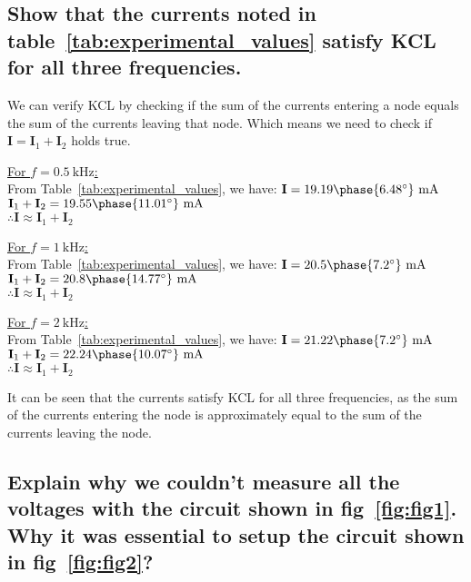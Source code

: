 \documentclass[12pt]{article}
\begin{document}
\begin{large}
	\subsection{Show that the currents noted in table~\ref{tab:experimental_values} satisfy KCL for all three frequencies.}
	We can verify KCL by checking if the sum of the currents entering a node equals the sum of the currents leaving that node. Which means we need to check if $ \mathbf{I} = \mathbf{I}_1 + \mathbf{I}_2 $ holds true.
	\par \underline{For $ f = \SI{0.5}{\kilo\hertz} $:}\\
	From Table~\ref{tab:experimental_values}, we have:
	$ \mathbf{I} = 19.19\phase{6.48^\circ}~\SI{}{\milli\A} $\\
	$ \mathbf{I}_1 + \mathbf{I}_2 = 19.55\phase{11.01^\circ}~\SI{}{\milli\A} $\\
	$ \therefore \mathbf{I} \approx \mathbf{I}_1 + \mathbf{I}_2 $
	\par \underline{For $ f = \SI{1}{\kilo\hertz} $:}\\
	From Table~\ref{tab:experimental_values}, we have:
	$ \mathbf{I} = 20.5\phase{7.2^\circ}~\SI{}{\milli\A} $\\
	$ \mathbf{I}_1 + \mathbf{I}_2 = 20.8\phase{14.77^\circ}~\SI{}{\milli\A} $\\
	$ \therefore \mathbf{I} \approx \mathbf{I}_1 + \mathbf{I}_2 $
	\par \underline{For $ f = \SI{2}{\kilo\hertz} $:}\\
	From Table~\ref{tab:experimental_values}, we have:
	$ \mathbf{I} = 21.22\phase{7.2^\circ}~\SI{}{\milli\A} $\\
	$ \mathbf{I}_1 + \mathbf{I}_2 = 22.24\phase{10.07^\circ}~\SI{}{\milli\A} $\\
	$ \therefore \mathbf{I} \approx \mathbf{I}_1 + \mathbf{I}_2 $
	
	It can be seen that the currents satisfy KCL for all three frequencies, as the sum of the currents entering the node is approximately equal to the sum of the currents leaving the node.

	\subsection{Explain why we couldn't measure all the voltages with the circuit shown in fig~\ref{fig:fig1}. Why it was essential to setup the circuit shown in fig~\ref{fig:fig2}?}

\end{large}
\end{document}
